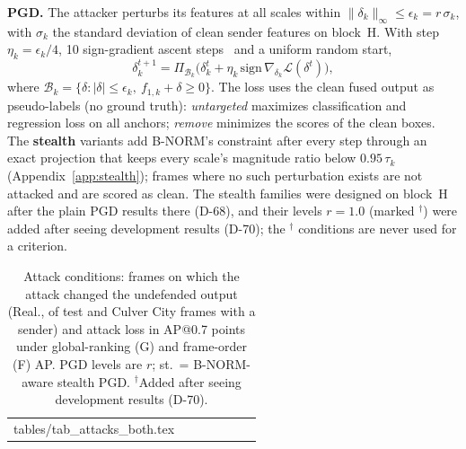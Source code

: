 \documentclass[conference]{IEEEtran}
\makeatletter
\newcommand{\tabin}[1]{\@@input #1 }
\makeatother
\begin{document}
\textbf{PGD.} The attacker perturbs its features at all scales within $\|\delta_k\|_\infty\le\epsilon_k=r\,\sigma_k$,
with $\sigma_k$ the standard deviation of clean sender features on block~H. With step $\eta_k=\epsilon_k/4$, 10
sign-gradient ascent steps~\cite{madry2018pgd} and a uniform random start,
\begin{equation}
\delta_k^{t+1}=\Pi_{\mathcal{B}_k}\!\big(\delta_k^{t}+\eta_k\,\mathrm{sign}\,\nabla_{\delta_k}\mathcal{L}(\delta^{t})\big),
\label{eq:pgd}
\end{equation}
where $\mathcal{B}_k=\{\delta:|\delta|\le\epsilon_k,\ f_{1,k}+\delta\ge 0\}$. The loss uses the clean fused output as
pseudo-labels (no ground truth): \emph{untargeted} maximizes classification and regression loss on all anchors;
\emph{remove} minimizes the scores of the clean boxes. The \textbf{stealth} variants add B-NORM's constraint after
every step through an exact projection that keeps every scale's magnitude ratio below $0.95\,\tau_k$
(Appendix~\ref{app:stealth}); frames where no such perturbation exists are not attacked and are scored as clean.
The stealth families were designed on block~H after the plain PGD results there (D-68), and their levels
$r=1.0$ (marked $^\dagger$) were added after seeing development results (D-70); the $^\dagger$ conditions are
never used for a criterion.

\begin{table}[!t]
\caption{Attack conditions: frames on which the attack changed the undefended output (Real., of
\WithSenderSpoofFeat{} test and \CulWithSender{} Culver City frames with a sender) and attack loss in AP@0.7
points under global-ranking (G) and frame-order (F) AP. PGD levels are $r$; st.\ = B-NORM-aware stealth PGD.
$^\dagger$Added after seeing development results (D-70).}
\label{tab:attacks}
\centering
\footnotesize
\setlength{\tabcolsep}{2.6pt}
\begin{tabular}{@{}lrrrrrr@{}}
\toprule
\tabin{tables/tab_attacks_both.tex}
\bottomrule
\end{tabular}
\end{table}
\end{document}
